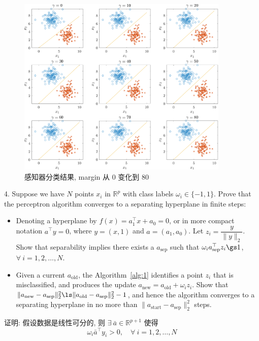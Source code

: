 \documentclass[openany]{ctexbook}
\theoremstyle{kaiti}
\theoremstyle{normal}
\begin{document}
\begin{figure}[htbp]
  \centering
  \includegraphics[width=0.9\textwidth]{marginEffect2.pdf}
  \caption{感知器分类结果, margin 从 0 变化到 80}
  \label{fig:marginEffect2}
\end{figure}

4. Suppose we have $N$ points $x_i$ in $\mathbb{R}^p$ with class labels $\omega_i\in\{-1,1\}$. Prove that the perceptron algorithm converges to a separating hyperplane in finite steps:
\begin{itemize}
  \item Denoting a hyperplane by $f(x)=a_1^{\top}x+a_0=0$, or in more compact notation $a^{\top}y= 0$, where $y=(x,1)$ and $a=(a_1,a_0)$. Let $z_i=\dfrac{y}{\|y\|_2}$. Show that separability implies there exists a $a_{\mathrm{sep}}$ such that $\omega_ia_{\mathrm{sep}}^{\top}z_i\gs1$, $\forall~i=1,2,\dots,N$.
  \item Given a current $a_{\mathrm{old}}$, the Algorithm~\ref{alg:1} identifies a point $z_i$ that is misclassified, and produces the update $a_{\mathrm{new}} = a_{\mathrm{old}}+\omega_iz_i$. Show that $\|a_{\mathrm{new}}-a_{\mathrm{sep}}\|_2^2\ls\|a_{\mathrm{old}}-a_{\mathrm{sep}}\|_2^2-1$, and hence the algorithm converges to a separating hyperplane in no more than $\|a_{\mathrm{start}}-a_{\mathrm{sep}}\|_2^2$ steps. 
\end{itemize}

证明: 假设数据是线性可分的, 则 $\exists~\bar{a}\in\mathbb{R}^{p+1}$ 使得
\begin{equation}
  \omega_i\bar{a}^{\top}y_i>0,\quad \forall~i=1,2,\dots,N
\end{equation}
\end{document}
